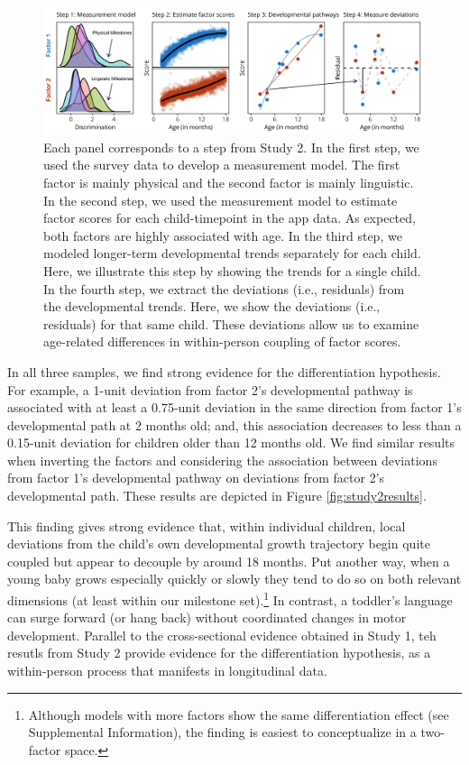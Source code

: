 \documentclass[man, floatsintext]{apa7}
\begin{document}
\begin{figure}[t!]
\centering
\includegraphics[width=1\columnwidth]{figures/bigfigure.png}
\caption{Each panel corresponds to a step from Study 2. In the first step, we used the survey data to develop a measurement model. The first factor is mainly physical and the second factor is mainly linguistic. In the second step, we used the measurement model to estimate factor scores for each child-timepoint in the app data. As expected, both factors are highly associated with age. In the third step, we modeled longer-term developmental trends separately for each child. Here, we illustrate this step by showing the trends for a single child. In the fourth step, we extract the deviations (i.e., residuals) from the developmental trends. Here, we show the deviations (i.e., residuals) for that same child. These deviations allow us to examine age-related differences
in within-person coupling of factor scores.}
\label{fig:study2}
\end{figure}

In all
three samples, we find strong evidence for the differentiation
hypothesis. For example, a 1-unit deviation from factor 2's
developmental pathway is associated with at least a 0.75-unit deviation
in the same direction from factor 1's developmental path at 2 months
old; and, this association decreases to less than a 0.15-unit deviation
for children older than 12 months old. We find similar results when
inverting the factors and considering the association between deviations
from factor 1's developmental pathway on deviations from factor 2's
developmental path. These results are depicted in Figure
\ref{fig:study2results}. 

This finding gives strong evidence that, within individual children, local deviations from the child's own developmental growth trajectory begin quite coupled but appear to decouple by around 18 months. Put another way, when a young baby grows especially quickly or slowly they tend to do so on both relevant dimensions (at least within our milestone set).\footnote{Although models with more factors show the same differentiation effect (see Supplemental Information), the finding is easiest to conceptualize in a two-factor space.} In contrast, a toddler's language can surge forward (or hang back) without coordinated changes in motor development. Parallel to the cross-sectional evidence obtained in Study 1, teh resutls from Study 2 provide evidence for the differentiation hypothesis, as a within-person process that manifests in longitudinal data.
\end{document}
